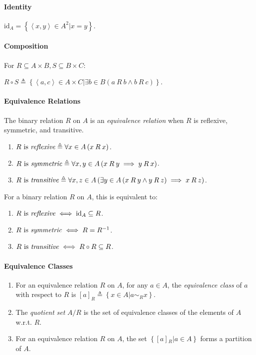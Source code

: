 \documentclass[10pt,twoside,twocolumn]{article}
\begin{document}
\paragraph{Identity}

$\mbox{id}_{A}=\left\{ \left\langle x,y\right\rangle \in A^{2}|x=y\right\} $.


\paragraph{Composition}

For $R\subseteq A\times B,S\subseteq B\times C$:

$R\circ S\triangleq\left\{ \left\langle a,c\right\rangle \in A\times C|\exists b\in B\left(a\:R\:b\land b\:R\:c\right)\right\} $.


\paragraph{Equivalence Relations}

The binary relation $R$ on $A$ is an \emph{equivalence relation}
when $R$ is reflexive, symmetric, and transitive.
\begin{enumerate}
\item $R\mbox{ is \emph{reflexive}}\triangleq\forall x\in A\left(x\:R\:x\right)$. 
\item $R\mbox{ is \emph{symmetric}}\triangleq\forall x,y\in A\left(x\:R\:y\implies y\:R\:x\right)$. 
\item $R\mbox{ is \emph{transitive}}\triangleq\forall x,z\in A\left(\exists y\in A\left(x\:R\:y\land y\:R\:z\right)\implies x\:R\:z\right)$. 
\end{enumerate}
For a binary relation $R$ on $A$, this is equivalent to: 
\begin{enumerate}
\item $R\mbox{ is \emph{reflexive}}\iff\mbox{id}_{A}\subseteq R$. 
\item $R\mbox{ is \emph{symmetric}}\iff R=R^{-1}$. 
\item $R\mbox{ is \emph{transitive}}\iff R\circ R\subseteq R$.
\end{enumerate}

\paragraph{Equivalence Classes}
\begin{enumerate}
\item For an equivalence relation $R$ on $A$, for any $a\in A$, the \emph{equivalence
class} of $a$ with respect to $R$ is $\left[a\right]_{R}\triangleq\left\{ x\in A|a\sim_{R}x\right\} $.
\item The \emph{quotient set} $A/R$ is the set of equivalence classes of the elements of $A$ w.r.t. $R$.
\item For an equivalence relation $R$ on $A$, the set $\left\{ \left[a\right]{}_{R}|a\in A\right\} $
forms a partition of $A$.
\end{enumerate}
\end{document}
